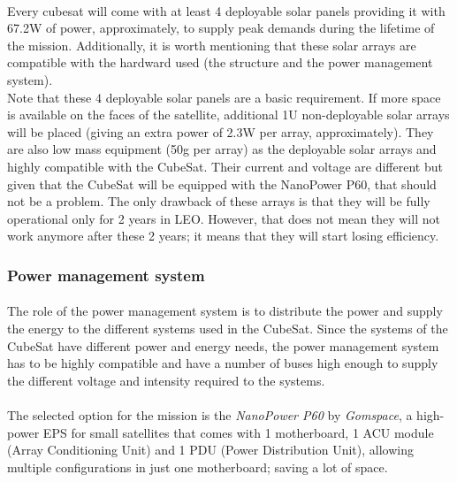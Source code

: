 \paragraph{}Every cubesat will come with at least 4 deployable solar panels providing it with 67.2W of power, approximately, to supply peak demands during the lifetime of the mission. Additionally, it is worth mentioning that these solar arrays are compatible with the hardward used (the structure and the power management system).\\
Note that these 4 deployable solar panels are a basic requirement. If more space is available on the faces of the satellite, additional 1U non-deployable solar arrays will be placed (giving an extra power of 2.3W per array, approximately). They are also low mass equipment (50g per array) as the deployable solar arrays and highly compatible with the CubeSat. Their current and voltage are different but given that the CubeSat will be equipped with the NanoPower P60, that should not be a problem. The only drawback of these arrays is that they will be fully operational only for 2 years in LEO. However, that does not mean they will not work anymore after these 2 years; it means that they will start losing efficiency.

\subsubsection{Power management system}

\paragraph{}The role of the power management system is to distribute the power and supply the energy to the different systems used in the CubeSat. Since the systems of the CubeSat have different power and energy needs, the power management system has to be highly compatible and have a number of buses high enough to supply the different voltage and intensity required to the systems.

\paragraph{}The selected option for the mission is the \textit{NanoPower P60} by \textit{Gomspace}, a high-power EPS for small satellites that comes with 1 motherboard, 1 ACU module (Array Conditioning Unit) and 1 PDU (Power Distribution Unit), allowing multiple configurations in just one motherboard; saving a lot of space.

